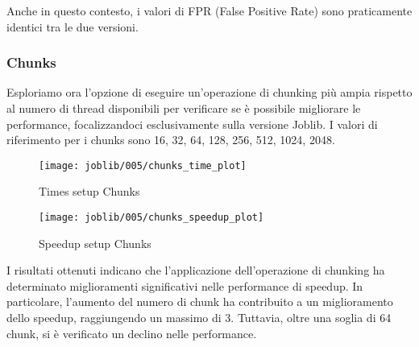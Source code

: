 Anche in questo contesto, i valori di FPR (False Positive Rate) sono praticamente identici tra le due versioni.

\subsubsection{Chunks}\label{subsubsec:005-chunks}
Esploriamo ora l'opzione di eseguire un'operazione di chunking più ampia rispetto al numero di thread disponibili per
verificare se è possibile migliorare le performance, focalizzandoci esclusivamente sulla versione Joblib.
I valori di riferimento per i chunks sono 16, 32, 64, 128, 256, 512, 1024, 2048.

\begin{figure}[H]
    \centering
    \texttt{[image: joblib/005/chunks\_time\_plot]}
        \caption{Times setup Chunks}\label{fig:005-chunks_time}
    \endminipage\hfill
    \texttt{[image: joblib/005/chunks\_speedup\_plot]}
        \caption{Speedup setup Chunks}\label{fig:005-chunks_speedup}
    \endminipage\hfill
\end{figure}

I risultati ottenuti indicano che l'applicazione dell'operazione di chunking ha determinato miglioramenti
significativi nelle performance di speedup.
In particolare, l'aumento del numero di chunk ha contribuito a un miglioramento dello speedup,
raggiungendo un massimo di 3.
Tuttavia, oltre una soglia di 64 chunk, si è verificato un declino nelle performance.





